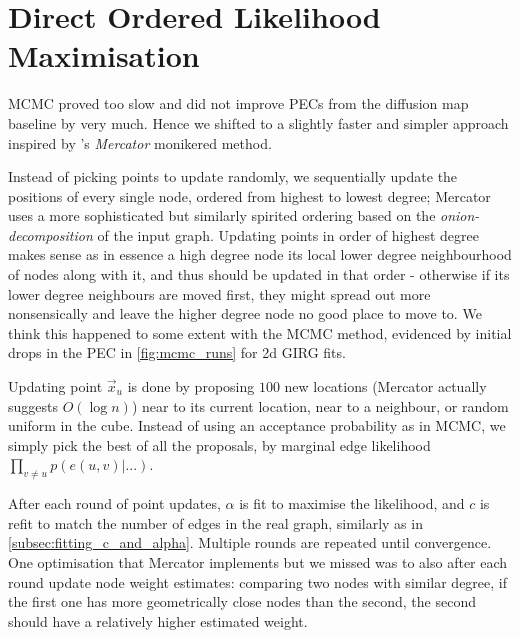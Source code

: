\section{Direct Ordered Likelihood Maximisation}
\label{sec:direct_ordered_likelihood_maximisation}
MCMC proved too slow and did not improve PECs from the diffusion map baseline by very much. Hence we shifted to a slightly faster and simpler approach inspired by \cite{garcia2019mercator}'s  \textit{Mercator} monikered method.

Instead of picking points to update randomly, we sequentially update the positions of every single node, ordered from highest to lowest degree; Mercator uses a more sophisticated but similarly spirited ordering based on the \textit{onion-decomposition} of the input graph.
Updating points in order of highest degree makes sense as in essence a high degree node  its local lower degree neighbourhood of nodes along with it, and thus should be updated in that order - otherwise if its lower degree neighbours are moved first, they might spread out more nonsensically and leave the higher degree node no good place to move to. We think this happened to some extent with the MCMC method, evidenced by initial drops in the PEC in \cref{fig:mcmc_runs} for 2d GIRG fits.

Updating point $\vec{x}_u$ is done by proposing $100$ new locations (Mercator actually suggests $O(\log n)$) near to its current location, near to a neighbour, or random uniform in the cube. Instead of using an acceptance probability as in MCMC, we simply pick the best of all the proposals, by marginal edge likelihood $\prod_{v \neq u} p(e(u,v) | ...)$.

After each round of point updates, $\alpha$ is fit to maximise the likelihood, and $c$ is refit to match the number of edges in the real graph, similarly as in \cref{subsec:fitting_c_and_alpha}. Multiple rounds are repeated until convergence. One optimisation that Mercator implements but we missed was to also after each round update node weight estimates: comparing two nodes with similar degree, if the first one has more geometrically close nodes than the second, the second should have a relatively higher estimated weight.


